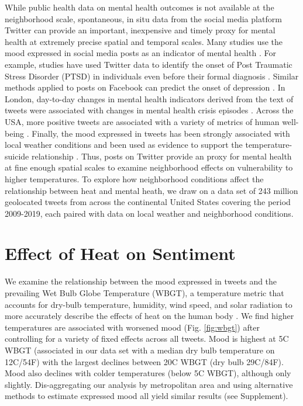 \documentclass[fleqn,10pt]{wlscirep}
\begin{document}
While public health data on mental health outcomes is not available at the neighborhood scale, spontaneous, in situ data from the social media platform Twitter can provide an important, inexpensive and timely proxy for mental health at extremely precise spatial and temporal scales. Many studies use the mood expressed in social media posts as an indicator of mental health \cite{Edo-Osagie2020Jul, Sinnenberg2016Dec}. For example, studies have used Twitter data to identify the onset of Post Traumatic Stress Disorder (PTSD) in individuals even before their formal diagnosis \cite{Reece2017Oct}. Similar methods applied to posts on Facebook can predict the onset of depression \cite{Eichstaedt2018Oct}. In London, day-to-day changes in mental health indicators derived from the text of tweets were associated with changes in mental health crisis episodes \cite{Kolliakou2020Feb}. Across the USA, more positive tweets are associated with a variety of metrics of human well-being \cite{Mitchell2013May}. Finally, the mood expressed in tweets has been strongly associated with local weather conditions \cite{baylis_weather_2018, hannak_tweetin_2012} and been used as evidence to support the temperature-suicide relationship \cite{Burke2018Aug}. Thus, posts on Twitter provide an proxy for mental health at fine enough spatial scales to examine neighborhood effects on vulnerability to higher temperatures. To explore how neighborhood conditions affect the relationship between heat and mental heath, we draw on a data set of 243 million geolocated tweets from across the continental United States covering the period 2009-2019, each paired with data on local weather and neighborhood conditions.

\section*{Effect of Heat on Sentiment}
We examine the relationship between the mood expressed in tweets and the prevailing Wet Bulb Globe Temperature (WBGT), a temperature metric that accounts for dry-bulb temperature, humidity, wind speed, and solar radiation to more accurately describe the effects of heat on the human body \cite{budd2008wet}. We find higher temperatures are associated with worsened mood (Fig. \ref{fig:wbgt}) after controlling for a variety of fixed effects across all tweets. Mood is highest at 5\textdegree C WBGT (associated in our data set with a median dry bulb temperature on 12\textdegree C/54\textdegree F) with the largest declines between 20\textdegree C WBGT (dry bulb 29\textdegree C/84\textdegree F). Mood also declines with colder temperatures (below 5\textdegree C WBGT), although only slightly. Dis-aggregating our analysis by metropolitan area and using alternative methods to estimate expressed mood all yield similar results (see Supplement).
\end{document}
